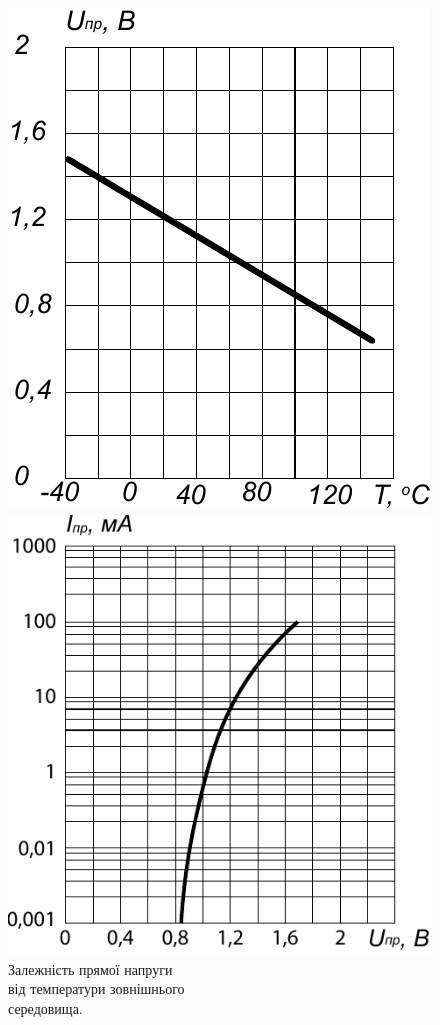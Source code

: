 \documentclass[a4paper,14pt]{extreport}
\begin{document}
\begin{figure}[h!]\label{im7}
  \begin{minipage}[h]{0.5\linewidth}
    \includegraphics[width=1\linewidth]{1.3.25.pdf}
    \caption{Залежність прямої напруги \\від температури зовнішнього \\середовища.}
  \end{minipage}
\hfill
  \begin{minipage}[h]{0.55\linewidth}
    \includegraphics[width=1\linewidth]{1.3.26.pdf}

\end{minipage}
\end{figure}
\end{document}
